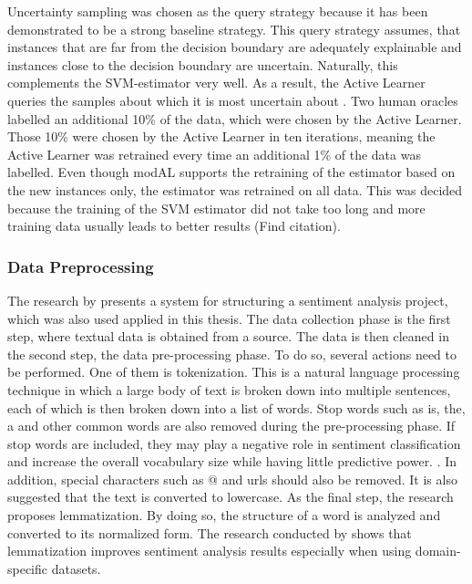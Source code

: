 \documentclass[11pt, a4paper]{article}
\begin{document}
Uncertainty sampling was chosen as the query strategy because it has been demonstrated to be a strong baseline strategy. 
This query strategy assumes, that instances that are far from the decision boundary are adequately explainable and instances close to the 
decision boundary are uncertain. Naturally, this complements the SVM-estimator very well. As a result, the Active Learner queries 
the samples about which it is most uncertain about \citep{osbonre2004ensemblebased}. Two human oracles labelled an additional 10\% of the data,
which were chosen by the Active Learner. Those 10\% were chosen by the Active Learner in ten iterations, meaning the Active Learner was retrained
every time an additional 1\% of the data was labelled. Even though modAL supports the retraining of the estimator based on the new instances only,
the estimator was retrained on all data. This was decided because the training of the SVM estimator did not take too long and more training data
usually leads to better results (Find citation).

\subsubsection{Data Preprocessing}
The research by \cite{jemai2021SentimentAnalysis} presents a system for structuring a sentiment analysis project, which was also used applied in this thesis.
The data collection phase is the first step, where textual data is obtained from a source. 
The data is then cleaned in the second step, the data pre-processing phase. To do so, several actions need to be performed.
One of them is tokenization. This is a natural language processing technique in which a large body of text is broken down into multiple sentences, 
each of which is then broken down into a list of words. Stop words such as is, the, a and other common words are also removed during the 
pre-processing phase. If stop words are included, they may play a negative role in sentiment classification and increase the overall 
vocabulary size while having little predictive power. \citep{zhao2017comparisontextprocess}.
In addition, special characters such as @ and urls should also be removed. 
It is also suggested that the text is converted to lowercase. As the final step, the research proposes lemmatization. By doing so,
the structure of a word is analyzed and converted to its normalized form. The research conducted by \cite{camachocollados2018role} 
shows that lemmatization improves sentiment analysis results especially when using domain-specific datasets.
\end{document}
